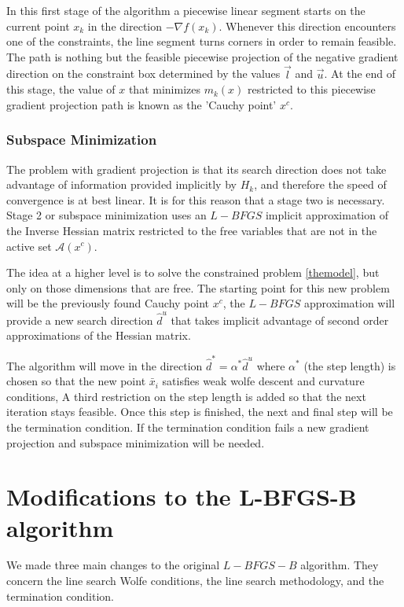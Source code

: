 In this first stage of the algorithm a piecewise linear segment starts on the current point $x_k$ in the direction $-\nabla f(x_k)$. Whenever this direction encounters one of the constraints, the line segment turns corners in order to remain feasible. The path is nothing but the feasible piecewise projection of the negative gradient direction on the constraint box determined by the values $\overrightarrow{l}$ and $\overrightarrow{u}$. At the end of this stage, the value of $x$ that minimizes $m_k(x)$ restricted to this piecewise gradient projection path is known as the 'Cauchy point' $x^c$.

\subsection{Subspace Minimization}

The problem with gradient projection is that its search direction does not take advantage of information provided implicitly by $H_k$, and therefore the speed of convergence is at best linear. It is for this reason that a stage two is necessary. Stage 2 or subspace minimization uses an $L-BFGS$ implicit approximation of the Inverse Hessian matrix restricted to the free variables that are not in the active set $\mathcal{A}(x^c)$.

The idea at a higher level is to solve the constrained problem \ref{themodel}, but only on those dimensions that are free. The starting point for this new problem will be the previously found Cauchy point $x^c$, the $L-BFGS$ approximation will provide a new search direction $\hat{d}^u$ that takes implicit advantage of second order approximations of the Hessian matrix.

The algorithm will move in the direction $\hat{d}^* = \alpha^* \hat{d}^u$ where $\alpha^*$ (the step length) is chosen so that the new point $\bar{x}_i$ satisfies weak wolfe descent and curvature conditions, A third restriction on the step length is added so that the next iteration stays feasible. Once this step is finished, the next and final step will be the termination condition. If the termination condition fails a new gradient projection and subspace minimization will be needed.

\chapter{Modifications to the L-BFGS-B algorithm}

We made three main changes to the original $L-BFGS-B$ algorithm. They concern the line search Wolfe conditions, the line search methodology, and the termination condition.

